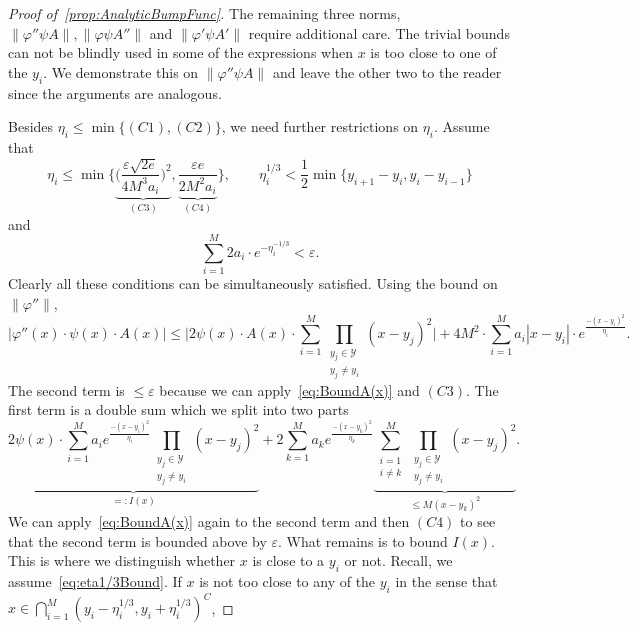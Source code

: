 \documentclass[11pt,]{article}
\def\cref#1{\ref{#1}}%
\theoremstyle{definition}
\theoremstyle{remark}
\newcommand{\0}{\mathbf{0}}
\numberwithin{equation}{section}
\begin{document}
\begin{proof}[Proof of~\cref{prop:AnalyticBumpFunc}]
The remaining three norms, $\|\varphi'' \psi A\|,\|\varphi \psi A''\|$ and $\|\varphi' \psi A'\|$
require additional care. The trivial bounds can not be blindly used in some of the expressions when
$x$ is too close to one of the $y_i$. We demonstrate this on $\|\varphi'' \psi A\|$ and leave the
other two to the reader since the arguments are analogous.

Besides $\eta_i\leq\min\{(C1),(C2)\}$, we need further restrictions on $\eta_i$. Assume that
\begin{equation}\label{eq:eta1/3Bound}
	\eta_i\leq \min \bigg\{ \underbrace{ \Big( \frac{\varepsilon\sqrt{2e}}{4M^3a_i} \Big)^2
	}_{(C3)}, \underbrace{ \frac{\varepsilon e}{2M^2a_i} }_{(C4)} \bigg\},\qquad
	\eta_i^{1/3} < \frac{1}{2} \min\big\{ y_{i+1}-y_i, y_i-y_{i-1} \big\} 
\end{equation}
and
\begin{equation}\label{eq:etaOtherBound}
	\sum_{i=1}^M 2a_i\cdot e^{-\eta_i^{-1/3}} < \varepsilon.
\end{equation}
Clearly all these conditions can be simultaneously satisfied. Using the bound on $\|\varphi''\|$,
\begin{equation*}
	\big|\varphi''(x)\cdot \psi(x)\cdot A(x)\big|\leq  \bigg| 2\psi(x)\cdot A(x)\cdot
	\sum_{i=1}^{M}  \prod_{\substack{y_j\in\mathcal{Y}\\ y_j\neq y_i}} (x-y_j)^2 \bigg| +
	4M^2\cdot \sum_{i=1}^{M} a_i|x-y_i| \cdot e^{\frac{-(x-y_i)^2}{\eta_i}}.
\end{equation*}
The second term is $\leq \varepsilon$ because we can apply~\cref{eq:BoundA(x)} and $(C3)$. The first
term is a double sum which we split into two parts
\begin{equation*}
	\underbrace{2\psi(x)\cdot  \sum_{i=1}^{M} a_i e^{\frac{-(x-y_i)^2}{\eta_i}}
	\prod_{\substack{y_j\in\mathcal{Y}\\ y_j\neq y_i}} (x-y_j)^2}_{=: I(x)} +
	2 \sum_{k=1}^{M}  a_k  e^{\frac{-(x-y_k)^2}{\eta_k}} \underbrace{\sum_{\substack{i=1 \\
	i\neq k}}^{M} \prod_{\substack{y_j\in\mathcal{Y}\\ y_j\neq y_i}} (x-y_j)^2}_{\leq
      M(x-y_k)^2}.
\end{equation*} 
We can apply~\cref{eq:BoundA(x)} again to the second term and then $(C4)$ to see that the second
term is bounded above by $\varepsilon$. What remains is to bound $I(x)$. This is where we distinguish whether
$x$ is close to a $y_i$ or not. Recall, we assume~\cref{eq:eta1/3Bound}. If $x$ is not too close to
any of the $y_i$ in the sense that $x\in\bigcap_{i=1}^M (y_i-\eta_i^{1/3}, y_i+\eta_i^{1/3})^C$,

\end{proof}
\end{document}
